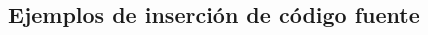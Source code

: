 	\lipsum[4]

	\begin{multicols}{2}

		\lipsum[4-5]
		
		
		\lipsum[1]
		
		
		\lipsum[11-13]

	\end{multicols}

\subsection{Ejemplos de inserción de código fuente}

	\newcommand{\insertsrcmanual}[2]{\href{https://latex.ppizarror.com/informe.html?srctype=#1\#hlp-srccode}{#2}}

